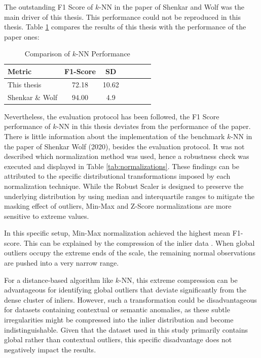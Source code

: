 The outstanding F1 Score of $k$-NN in the paper of Shenkar and Wolf was the main driver of this thesis. 
This performance could not be reproduced in this thesis. 
Table \ref{tab:comparison_knn} compares the results of this thesis with the performance of the paper ones:

\begin{table}[h]
\centering
\caption{Comparison of $k$-NN Performance}
\label{tab:comparison_knn}
\begin{tabular}{lcccccc} 
\toprule
\textbf{Metric}         & F1-Score          & SD            \\
\midrule
This thesis             & 72.18             & 10.62         \\
Shenkar \& Wolf         & 94.00             & 4.9           \\
\bottomrule
\end{tabular}
\end{table}

\newpage
Nevertheless, the evaluation protocol has been followed, the F1 Score performance of $k$-NN in this thesis deviates from the performance of the paper.
There is little information about the implementation of the benchmark $k$-NN in the paper of Shenkar Wolf (2020), besides the evaluation protocol.
It was not described which normalization method was used, hence a robustness check was executed and displayed in Table \ref{tab:normalizations}.
These findings can be attributed to the specific distributional transformations imposed by each normalization technique.  
While the Robust Scaler is designed to preserve the underlying distribution by using median and interquartile ranges to mitigate the masking effect of outliers, Min-Max and Z-Score normalizations are more sensitive to extreme values. 


In this specific setup, Min-Max normalization achieved the highest mean F1-score. 
This can be explained by the compression of the inlier data \citep{shrivastava2023anomaly}.
When global outliers occupy the extreme ends of the scale, the remaining normal observations are pushed into a very narrow range.  


For a distance-based algorithm like $k$-NN, this extreme compression can be advantageous for identifying global outliers that deviate significantly from the dense cluster of inliers. 
However, such a transformation could be disadvantageous for datasets containing contextual or semantic anomalies, as these subtle irregularities might be compressed into the inlier distribution and become indistinguishable. 
Given that the dataset used in this study primarily contains global rather than contextual outliers, this specific disadvantage does not negatively impact the results.


